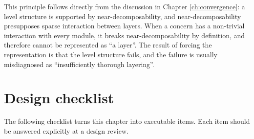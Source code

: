 This principle follows directly from the discussion in Chapter \ref{ch:convergence}: a
level structure is supported by near-decomposability, and near-decomposability presupposes
sparse interaction between layers. When a concern has a non-trivial interaction with every
module, it breaks near-decomposability by definition, and therefore cannot be represented as
``a layer''. The result of forcing the representation is that the level structure fails, and
the failure is usually misdiagnosed as ``insufficiently thorough layering''.

\section{Design checklist}\label{sec:checklist}

The following checklist turns this chapter into executable items. Each item should be
answered explicitly at a design review.

